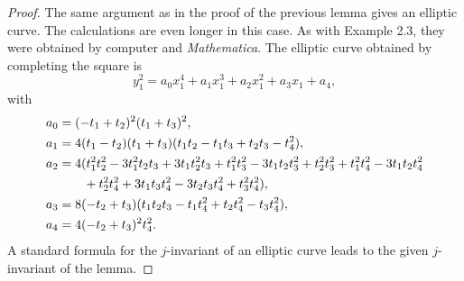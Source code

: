 \documentclass{amsart}
\begin{document}
\begin{proof}  The same argument as in the proof of the previous lemma 
gives an elliptic curve.  The calculations are even longer in this
case.  As with Example 2.3,
they were obtained by computer and {\it Mathematica}.
The elliptic curve obtained by completing the
square is
$$y_1^2 = a_0 x_1^4 + a_1 x_1^3 + a_2 x_1^2 + a_3 x_1 + a_4,$$
with
\begin{align*}
% 
%
%
%
%
 a_0 &= (-t_1+t_2)^2 (t_1+t_3)^2,\\
 a_1 &= 4(t_1-t_2)(t_1+t_3)(t_1 t_2-t_1 t_3 + t_2 t_3 - t_4^2),\\
 a_2 &= 4(t_1^2 t_2^2 - 3t_1^2t_2t_3 + 3t_1t_2^2 t_3 + t_1^2 t_3^2-3t_1t_2t_3^2
        + t_2^2t_3^2 + t_1^2t_4^2 - 3t_1 t_2t_4^2 \\
      &\hbox{}\qquad + t_2^2 t_4^2 + 3t_1t_3t_4^2 - 3t_2t_3t_4^2+t_3^2t_4^2),\\
 a_3 &= 8(-t_2+t_3)(t_1t_2t_3 - t_1t_4^2 + t_2t_4^2 - t_3t_4^2),\\
 a_4 &= 4(-t_2+t_3)^2t_4^2.
\end{align*}
A standard formula for the $j$-invariant of an elliptic curve leads to
the given $j$-invariant of the lemma.
\end{proof}
\end{document}
